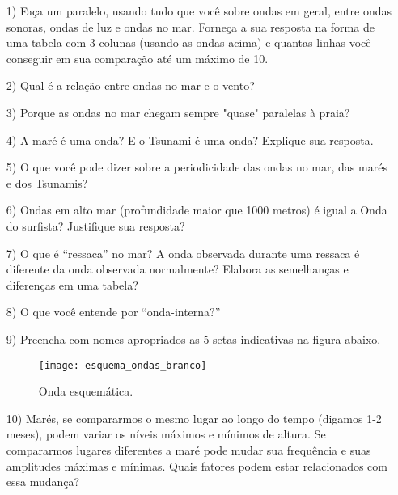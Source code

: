 \documentclass[a4paper,10pt]{article}
\begin{document}
    \begin{itemize}
      \item[1)] Faça um paralelo, usando tudo que você sobre ondas em geral, entre
            ondas sonoras, ondas de luz e ondas no mar.  Forneça a sua resposta
            na forma de uma tabela com 3 colunas (usando as ondas acima) e
            quantas linhas você conseguir em sua comparação até um máximo de 10.
      \item[2)] Qual é a relação entre ondas no mar e o vento?
      \item[3)] Porque as ondas no mar chegam sempre "quase" paralelas à praia?
      \item[4)] A maré é uma onda?  E o Tsunami é uma onda?  Explique sua resposta.
      \item[5)] O que você pode dizer sobre a periodicidade das ondas no mar, das
            marés e dos Tsunamis?
      \item[6)] Ondas em alto mar (profundidade maior que 1000 metros) é igual a
            Onda do surfista?  Justifique sua resposta?
      \item[7)] O que é ``ressaca'' no mar?  A onda observada durante uma ressaca é
            diferente da onda observada normalmente?  Elabora as semelhanças e
            diferenças em uma tabela?
      \item[8)] O que você entende por ``onda-interna?''

      \item[9)] Preencha com nomes apropriados as 5 setas indicativas na figura
            abaixo.

            \begin{figure}[h!]
              \centering
              \texttt{[image: esquema\_ondas\_branco]}
            \caption{Onda esquemática.}
          \end{figure}
      \item[10)] Marés, se compararmos o mesmo lugar ao longo do tempo
                 (digamos 1-2 meses), podem variar os níveis máximos e mínimos
                 de altura.  Se compararmos lugares diferentes a maré pode mudar
                 sua frequência e suas amplitudes máximas e mínimas.  Quais
                 fatores podem estar relacionados com essa mudança?
    \end{itemize}
\end{document}
